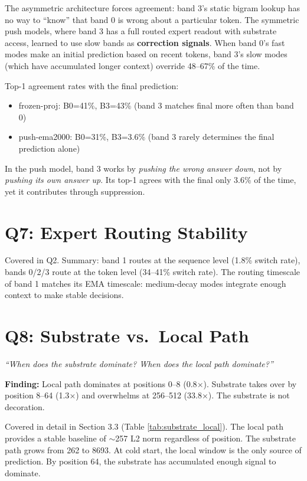 \documentclass[11pt,a4paper]{report}
\newcommand{\cq}[1]{\textcolor{q}{\textit{``#1''}}}
\newcommand{\finding}[1]{\textcolor{finding}{\textbf{Finding:}} #1}
\begin{document}
The asymmetric architecture forces agreement: band 3's static bigram lookup has no way to ``know'' that band 0 is wrong about a particular token. The symmetric push models, where band 3 has a full routed expert readout with substrate access, learned to use slow bands as \textbf{correction signals}. When band 0's fast modes make an initial prediction based on recent tokens, band 3's slow modes (which have accumulated longer context) override 48--67\% of the time.

Top-1 agreement rates with the final prediction:
\begin{itemize}[nosep]
\item frozen-proj: B0=41\%, B3=43\% (band 3 matches final more often than band 0)
\item push-ema2000: B0=31\%, B3=3.6\% (band 3 rarely determines the final prediction alone)
\end{itemize}

In the push model, band 3 works by \emph{pushing the wrong answer down}, not by \emph{pushing its own answer up}. Its top-1 agrees with the final only 3.6\% of the time, yet it contributes through suppression.


\section{Q7: Expert Routing Stability}

Covered in Q2. Summary: band 1 routes at the sequence level (1.8\% switch rate), bands 0/2/3 route at the token level (34--41\% switch rate). The routing timescale of band 1 matches its EMA timescale: medium-decay modes integrate enough context to make stable decisions.


\section{Q8: Substrate vs.\ Local Path}

\cq{When does the substrate dominate? When does the local path dominate?}

\finding{Local path dominates at positions 0--8 (0.8$\times$). Substrate takes over by position 8--64 (1.3$\times$) and overwhelms at 256--512 (33.8$\times$). The substrate is not decoration.}

Covered in detail in Section 3.3 (Table \ref{tab:substrate_local}). The local path provides a stable baseline of $\sim$257 L2 norm regardless of position. The substrate path grows from 262 to 8693. At cold start, the local window is the only source of prediction. By position 64, the substrate has accumulated enough signal to dominate.
\end{document}
